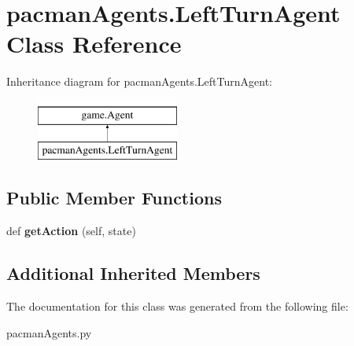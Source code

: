 \hypertarget{classpacman_agents_1_1_left_turn_agent}{}\section{pacman\+Agents.\+Left\+Turn\+Agent Class Reference}
\label{classpacman_agents_1_1_left_turn_agent}
Inheritance diagram for pacman\+Agents.\+Left\+Turn\+Agent\+:\begin{figure}[H]
\begin{center}
\leavevmode
\includegraphics[height=2.000000cm]{classpacman_agents_1_1_left_turn_agent}
\end{center}
\end{figure}
\subsection*{Public Member Functions}
\begin{DoxyCompactItemize}
\item 
\mbox{\label{classpacman_agents_1_1_left_turn_agent_a43d1804ba0a400dd83272ad3f634abc1}} 
def {\bfseries get\+Action} (self, state)
\end{DoxyCompactItemize}
\subsection*{Additional Inherited Members}


The documentation for this class was generated from the following file\+:\begin{DoxyCompactItemize}
\item 
pacman\+Agents.\+py\end{DoxyCompactItemize}
